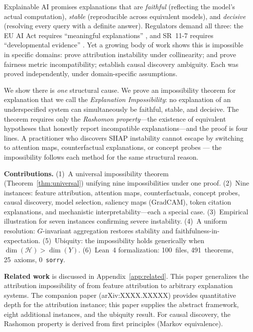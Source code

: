 \documentclass{article}
\newcommand{\sH}{\mathcal{H}}
\begin{document}
Explainable AI promises explanations that are
\emph{faithful} (reflecting the model's actual computation),
\emph{stable} (reproducible across equivalent models), and
\emph{decisive} (resolving every query with a definite answer).
Regulators demand all three: the EU AI Act requires ``meaningful
explanations'' \citep{euaiact2024}, and SR~11-7 requires
``developmental evidence'' \citep{occ2011sr117}.
Yet a growing body of work shows this is impossible in specific domains:
\citet{bilodeau2024impossibility} prove attribution instability under collinearity;
\citet{chouldechova2017fair} and \citet{kleinberg2017inherent}
prove fairness metric incompatibility;
\citet{verma1991equivalence} establish causal discovery ambiguity.
Each was proved independently, under domain-specific assumptions.

We show there is \emph{one} structural cause.  We prove an impossibility theorem for explanation that we call the \emph{Explanation Impossibility}: no explanation of an underspecified system can simultaneously be faithful, stable, and decisive.  The theorem requires only the \emph{Rashomon property}---the existence of equivalent hypotheses that honestly report incompatible explanations---and the proof is four lines.
A practitioner who discovers SHAP instability cannot escape by switching to attention maps, counterfactual explanations, or concept probes --- the impossibility follows each method for the same structural reason.

\textbf{Contributions.}
(1)~A universal impossibility theorem (Theorem~\ref{thm:universal}) unifying nine impossibilities under one proof.
(2)~Nine instances: feature attribution, attention maps, counterfactuals, concept probes, causal discovery, model selection, saliency maps (GradCAM), token citation explanations, and mechanistic interpretability---each a special case.
(3)~Empirical illustration for seven instances confirming severe instability.
(4)~A uniform resolution: $G$-invariant aggregation restores stability and faithfulness-in-expectation.
(5)~Ubiquity: the impossibility holds generically when $\dim(\sH) > \dim(Y)$.
(6)~Lean~4 formalization: 100~files, 491~theorems, 25~axioms, 0~\texttt{sorry}.

\textbf{Related work} is discussed in Appendix~\ref{app:related}. This paper generalizes the attribution impossibility of \citet{bilodeau2024impossibility} from feature attribution to arbitrary explanation systems. The companion paper (arXiv:XXXX.XXXXX) provides quantitative depth for the attribution instance; this paper supplies the abstract framework, eight additional instances, and the ubiquity result. For causal discovery, the Rashomon property is derived from first principles (Markov equivalence).
\end{document}
